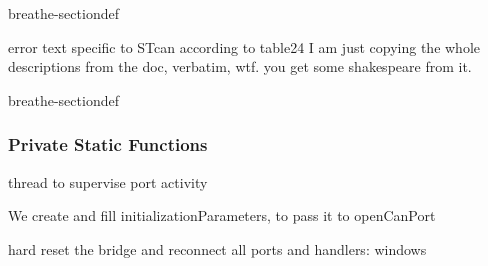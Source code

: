 \documentclass[a4paper,10pt,english]{sphinxmanual}
\begin{document}
\begin{fulllineitems}
\begin{sphinxuseclass}{breathe-sectiondef}
\begin{fulllineitems}
\end{fulllineitems}



\begin{fulllineitems}
%
\pysigstartmultiline
{}%
\pysigstopmultiline
\sphinxAtStartPar
error text specific to STcan according to table24 I am just copying the whole descriptions from the doc, verbatim, wtf. you get some shakespeare from it. 

\end{fulllineitems}


\end{sphinxuseclass}
\begin{sphinxuseclass}{breathe-sectiondef}\subsubsection*{Private Static Functions}


\begin{fulllineitems}
\sphinxAtStartPar
thread to supervise port activity 

\end{fulllineitems}



\begin{fulllineitems}
%
\pysigstartmultiline
{}%
\pysigstopmultiline
\sphinxAtStartPar
We create and fill initializationParameters, to pass it to openCanPort 

\end{fulllineitems}



\begin{fulllineitems}
%
\pysigstartmultiline
{}%
\pysigstopmultiline
\sphinxAtStartPar
hard reset the bridge and reconnect all ports and handlers: windows 


\end{fulllineitems}
\end{sphinxuseclass}
\end{fulllineitems}
\end{document}
